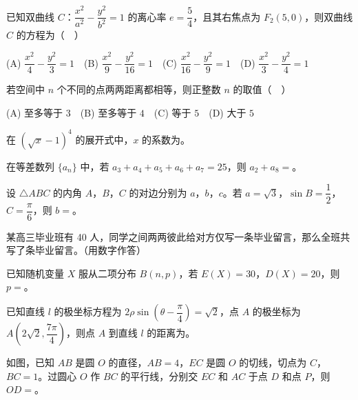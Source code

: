 \begin{question}
已知双曲线 \(C\)：\(\dfrac{x^2}{a^2}-\dfrac{y^2}{b^2}=1\) 的离心率 \(e=\dfrac{5}{4}\)，且其右焦点为 \(F_2(5,0)\)，则双曲线 \(C\) 的方程为（　）

(A) \(\dfrac{x^2}{4}-\dfrac{y^2}{3}=1\)　(B) \(\dfrac{x^2}{9}-\dfrac{y^2}{16}=1\)　(C) \(\dfrac{x^2}{16}-\dfrac{y^2}{9}=1\)　(D) \(\dfrac{x^2}{3}-\dfrac{y^2}{4}=1\)

\end{question}
\begin{question}
若空间中 \(n\) 个不同的点两两距离都相等，则正整数 \(n\) 的取值（　）

(A) 至多等于 \(3\)　(B) 至多等于 \(4\)　(C) 等于 \(5\)　(D) 大于 \(5\)

\end{question}

\begin{question}
在 \((\sqrt{x}-1)^4\) 的展开式中，\(x\) 的系数为\gkblank{}。

\end{question}
\begin{question}
在等差数列 \(\{a_n\}\) 中，若 \(a_3+a_4+a_5+a_6+a_7=25\)，则 \(a_2+a_8=\)\gkblank{}。

\end{question}
\begin{question}
设 \(\triangle ABC\) 的内角 \(A\)，\(B\)，\(C\) 的对边分别为 \(a\)，\(b\)，\(c\)。若 \(a=\sqrt{3}\)，\(\sin B=\dfrac{1}{2}\)，\(C=\dfrac{\pi}{6}\)，则 \(b=\)\gkblank{}。

\end{question}
\begin{question}
某高三毕业班有 40 人，同学之间两两彼此给对方仅写一条毕业留言，那么全班共写了\gkblank{}条毕业留言。（用数字作答）

\end{question}
\begin{question}
已知随机变量 \(X\) 服从二项分布 \(B(n,p)\)，若 \(E(X)=30\)，\(D(X)=20\)，则 \(p=\)\gkblank{}。

\end{question}
\begin{question}
已知直线 \(l\) 的极坐标方程为 \(2\rho\sin\left(\theta-\dfrac{\pi}{4}\right)=\sqrt{2}\)，点 \(A\) 的极坐标为 \(A\left(2\sqrt{2},\dfrac{7\pi}{4}\right)\)，则点 \(A\) 到直线 \(l\) 的距离为\gkblank{}。

\Needspace{0.4\textheight}
\end{question}
\begin{question}
如图，已知 \(AB\) 是圆 \(O\) 的直径，\(AB=4\)，\(EC\) 是圆 \(O\) 的切线，切点为 \(C\)，\(BC=1\)。过圆心 \(O\) 作 \(BC\) 的平行线，分别交 \(EC\) 和 \(AC\) 于点 \(D\) 和点 \(P\)，则 \(OD=\)\gkblank{}。
\nopagebreak[4]
\begin{center}\end{center}
\nopagebreak[4]
\end{question}

